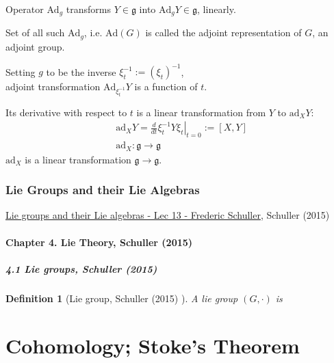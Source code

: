 \documentclass[10pt]{amsart}
\newtheorem{definition}{Definition}
\begin{document}
\begin{multicols*}{2}
Operator $\text{Ad}_g$ transforms $Y \in \mathfrak{g}$ into $\text{Ad}_g Y \in \mathfrak{g}$, linearly. 

Set of all such $\text{Ad}_g$, i.e. $\text{Ad}(G)$ is called the adjoint representation of $G$, an adjoint group. 

Setting $g$ to be the inverse $\xi^{-1}_t := (\xi_t)^{-1}$, \\
adjoint transformation $\text{Ad}_{\xi^{-1}_t} Y$ is a function of $t$.

Its derivative with respect to $t$ is a linear transformation from $Y$ to $\text{ad}_X Y$:
\begin{equation}
\begin{aligned}
	& \text{ad}_X Y = \left. \frac{d}{dt} \xi_t^{-1} Y \xi_t \right|_{t=0} := [X, Y] \\
	& \text{ad}_X : \mathfrak{g} \to \mathfrak{g}
\end{aligned}
\end{equation}
$\text{ad}_X $ is a linear transformation $\mathfrak{g} \to \mathfrak{g}$.





\section{Lie Groups and their Lie Algebras}

\href{https://youtu.be/mJ8ZDdA10GY}{Lie groups and their Lie algebras - Lec 13 - Frederic Schuller}, Schuller (2015) \cite{Schu2015}

\subsection{Chapter 4. Lie Theory, Schuller (2015) \cite{Schu2015}}

\subsubsection{4.1 Lie groups, Schuller (2015) \cite{Schu2015}}

\begin{definition}[Lie group, Schuller (2015) \cite{Schu2015}] A lie group $(G, \cdot )$ is 
\end{definition}

\part{Cohomology; Stoke's Theorem}


\end{multicols*}
\end{document}
